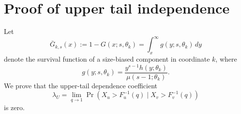 \documentclass[eng]{csam}
\begin{document}
{\section{Proof of upper tail independence}\label{app:tail}

Let
\begin{equation*}
\bar G_{k,s}(x):=1-G(x;s,\theta_k) =\int_x^\infty g(y;s,\theta_k)\,dy
\end{equation*}
denote the survival function of a size-biased component in coordinate $k$, where
\begin{equation*}
g(y;s,\theta_k)=\frac{y^{s-1}h(y;\theta_k)}{\mu(s-1;\theta_k)}.
\end{equation*}
We prove that the upper-tail dependence coefficient
\begin{equation*}
\lambda_U =\lim_{q\to1} \Pr\left(X_u>F_u^{-1}(q)\mid X_v>F_v^{-1}(q)\right)
\end{equation*}
is zero.

}
\end{document}
